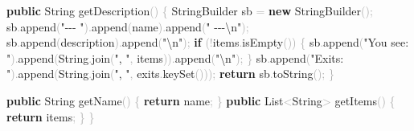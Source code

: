 \documentclass[
  justified,
  openright,
]{tufte-book}
\newcommand{\KeywordTok}[1]{\textcolor{CodeKeyword}{\textbf{#1}}}  %
\newcommand{\StringTok}[1]{\textcolor{CodeString}{#1}}              %
\newcommand{\CodeFuncTok}[1]{\textcolor{CodeKeyword}{#1}}           %
\newcommand{\OperatorTok}[1]{\textcolor{DarkGray}{#1}}              %
\newenvironment{Shaded}{%
  \begin{mdframed}[style=TufteCode]%
}{%
  \end{mdframed}%
}
\begin{document}
\begin{Shaded}
\begin{Highlighting}[]
    \KeywordTok{public} String \CodeFuncTok{getDescription}\OperatorTok{()} \OperatorTok{\{}
        StringBuilder sb \OperatorTok{=} \KeywordTok{new} StringBuilder\OperatorTok{();}
        sb\OperatorTok{.}\CodeFuncTok{append}\OperatorTok{(}\StringTok{"{-}{-}{-} "}\OperatorTok{).}\CodeFuncTok{append}\OperatorTok{(}name\OperatorTok{).}\CodeFuncTok{append}\OperatorTok{(}\StringTok{" {-}{-}{-}}\StringTok{\textbackslash{}n}\StringTok{"}\OperatorTok{);}
        sb\OperatorTok{.}\CodeFuncTok{append}\OperatorTok{(}description\OperatorTok{).}\CodeFuncTok{append}\OperatorTok{(}\StringTok{"}\StringTok{\textbackslash{}n}\StringTok{"}\OperatorTok{);}
        \KeywordTok{if} \OperatorTok{(!}items\OperatorTok{.}\CodeFuncTok{isEmpty}\OperatorTok{())} \OperatorTok{\{}
            sb\OperatorTok{.}\CodeFuncTok{append}\OperatorTok{(}\StringTok{"You see: "}\OperatorTok{).}\CodeFuncTok{append}\OperatorTok{(}String\OperatorTok{.}\CodeFuncTok{join}\OperatorTok{(}\StringTok{", "}\OperatorTok{,} items\OperatorTok{)).}\CodeFuncTok{append}\OperatorTok{(}\StringTok{"}\StringTok{\textbackslash{}n}\StringTok{"}\OperatorTok{);}
        \OperatorTok{\}}
        sb\OperatorTok{.}\CodeFuncTok{append}\OperatorTok{(}\StringTok{"Exits: "}\OperatorTok{).}\CodeFuncTok{append}\OperatorTok{(}String\OperatorTok{.}\CodeFuncTok{join}\OperatorTok{(}\StringTok{", "}\OperatorTok{,} exits\OperatorTok{.}\CodeFuncTok{keySet}\OperatorTok{()));}
        \KeywordTok{return} sb\OperatorTok{.}\CodeFuncTok{toString}\OperatorTok{();}
    \OperatorTok{\}}
 
    \KeywordTok{public} String \CodeFuncTok{getName}\OperatorTok{()} \OperatorTok{\{} \KeywordTok{return} name\OperatorTok{;} \OperatorTok{\}}
    \KeywordTok{public} List\OperatorTok{\textless{}}String\OperatorTok{\textgreater{}} \CodeFuncTok{getItems}\OperatorTok{()} \OperatorTok{\{} \KeywordTok{return} items\OperatorTok{;} \OperatorTok{\}}
\OperatorTok{\}}
\end{Highlighting}
\end{Shaded}
\end{document}
